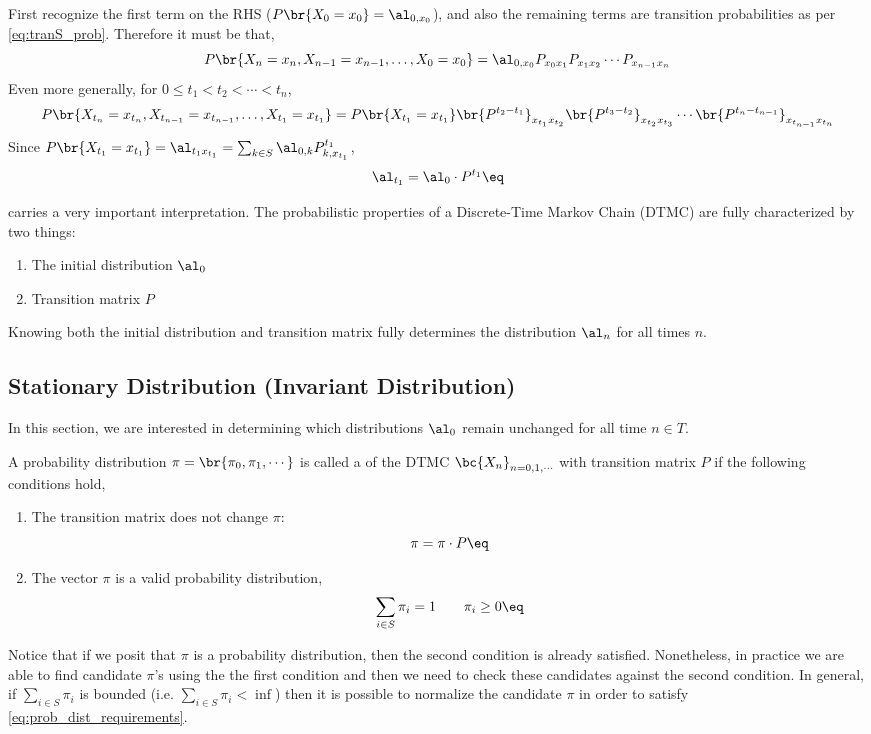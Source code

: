 \documentclass{article}
\newcommand{\val}[1]{X_{#1} = x_{#1}}
\begin{document}
First recognize the first term on the RHS ($P\br{X_{0} = x_{0}} = \al_{0, x_0}$), and also the remaining terms are transition probabilities as per \cref{eq:tranS_prob}. Therefore it must be that,
\[ P\br{X_n=x_n, X_{n-1}=x_{n-1}, \ldots, X_{0}=x_{0}} = \al_{0, x_0} P_{x_0x_1}P_{x_1x_2}\cdots P_{x_{n-1}x_n} \]
Even more generally, for $0 \leq t_1 < t_2 < \cdots < t_n$,
\[ P\br{\val{t_n}, \val{t_{n-1}}, \ldots, \val{t_{1}}} = P\br{\val{t_1}} \br{P^{t_2 - t_1}}_{x_{t_1}x_{t_2}}\br{P^{t_3 - t_2}}_{x_{t_2}x_{t_3}}\cdots\br{P^{t_{n} - t_{n-1}}}_{x_{t_{n-1}}x_{t_{n}}}  \]
Since $P\br{\val{t_1}} = \al_{t_1 x_{t_1}} = \sum_{k \in S} \al_{0, k} P^{t_1}_{k, x_{t_1}}$,
\[ \al_{t_1} = \al_{0} \cdot P^{t_1} \eq \label{eq:distribution_fundamentals} \]
\begin{remark}
 carries a very important interpretation. The probabilistic properties of a Discrete-Time Markov Chain (DTMC) are fully characterized by two things:
\begin{enumerate}
    \item The initial distribution $\al_{0}$
    \item Transition matrix $P$
\end{enumerate}
Knowing both the initial distribution and transition matrix fully determines the distribution $\al_{n}$ for all times $n$.
\end{remark}

\subsection{Stationary Distribution (Invariant Distribution)}
In this section, we are interested in determining which distributions $\al_{0}$ remain unchanged for all time $n \in T$.
\begin{definition}
    A probability distribution $\pi = \br{\pi_0, \pi_1, \cdots}$ is called a  of the DTMC $\bc{X_n}_{n = 0,1, \cdots}$ with transition matrix $P$ if the following conditions hold,
    \begin{enumerate}
        \item The transition matrix does not change $\pi$:
        \[  \pi = \pi \cdot P \eq \label{eq:invariant}\]
        \item The vector $\pi$ is a valid probability distribution,
        \[ \sum_{i \in S} \pi_i = 1 \qquad \pi_i \geq 0 \eq \label{eq:prob_dist_requirements}\]
    \end{enumerate}
\end{definition}
Notice that if we posit that $\pi$ is a probability distribution, then the second condition is already satisfied. Nonetheless, in practice we are able to find candidate $\pi$'s using the the first condition and then we need to check these candidates against the second condition. In general, if $\sum_{i \in S} \pi_i$ is bounded (i.e. $\sum_{i \in S} \pi_i < \inf$) then it is possible to normalize the candidate $\pi$ in order to satisfy \cref{eq:prob_dist_requirements}. \\
\end{document}
